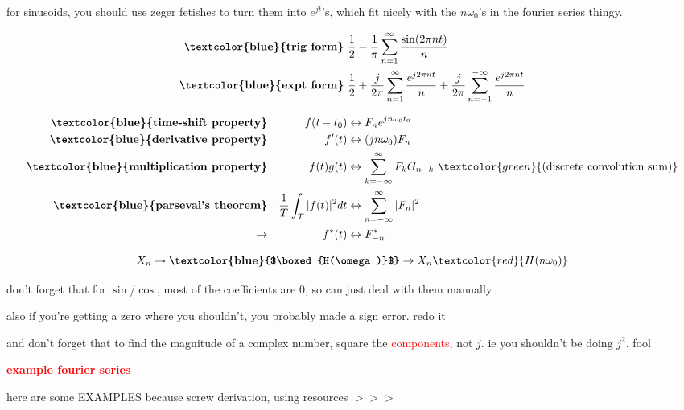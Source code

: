 \documentclass[a5paper, fleqn]{article}
\newcommand{\vocab}[1]{\textbf{\textcolor{blue}{#1}}}
\newcommand{\heading}[1]{\textbf{\textcolor{red}{#1}}}
\newcommand{\emf}[1]{\textcolor{red}{#1}}
\newcommand{\note}[1]{\textcolor{green}{#1}}
\newcommand{\wrap}{\hangpara{0.5cm}{1}}
\begin{document}
\wrap for sinusoids, you should use zeger fetishes to turn them into $e^{jt}$'s, which fit nicely with the $n\omega_0$'s in the fourier series thingy.

\begin{align*}
  \vocab{trig form} & ~ \frac{1}{2} - \frac{1}{\pi} \sum_{n = 1}^\infty \frac{\sin(2\pi nt)}{n}                                                                 \\
  \vocab{expt form} & ~ \frac{1}{2} + \frac{j}{2\pi} \sum_{n = 1}^\infty \frac{e^{j2\pi nt}}{n} + \frac{j}{2\pi} \sum_{n = -1}^{-\infty} \frac{e^{j2\pi nt}}{n}
\end{align*}

\begin{align*}
  \vocab{time-shift property}     &  & f(t - t_0)                     & \leftrightarrow F_n e^{jn\omega_0 t_0}                                                             \\
  \vocab{derivative property}     &  & f^\prime(t)                    & \leftrightarrow (jn\omega_0)F_n                                                                    \\
  \vocab{multiplication property} &  & f(t) g(t)                      & \leftrightarrow \sum_{k = -\infty}^\infty F_k G_{n - k} ~ \note{\text{(discrete convolution sum)}} \\
  \vocab{parseval's theorem}      &  & \frac{1}{T} \int_T |f(t)|^2 dt & \leftrightarrow \sum_{n = -\infty}^\infty |F_n|^2                                                  \\
  \to                             &  & f^*(t)                         & \leftrightarrow F^*_{-n}
\end{align*}

\[X_n \to \vocab{$\boxed{H(\omega)}$} \to X_n \emf{H(n\omega_0)}\]

don't forget that for $\sin$/$\cos$, most of the coefficients are 0, so can just deal with them manually

also if you're getting a zero where you shouldn't, you probably made a sign error. redo it

\wrap and don't forget that to find the magnitude of a complex number, square the \emf{components}, not $j$. ie you shouldn't be doing $j^2$. fool

\heading{example fourier series}

here are some EXAMPLES because screw derivation, using resources $>>>$
\end{document}

